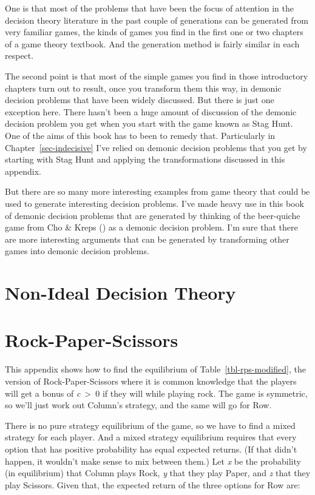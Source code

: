 \documentclass[
  12pt,
  letterpaper,
  DIV=11,
  numbers=noendperiod]{scrreprt}
\begin{document}
One is that most of the problems that have been the focus of attention
in the decision theory literature in the past couple of generations can
be generated from very familiar games, the kinds of games you find in
the first one or two chapters of a game theory textbook. And the
generation method is fairly similar in each respect.

The second point is that most of the simple games you find in those
introductory chapters turn out to result, once you transform them this
way, in demonic decision problems that have been widely discussed. But
there is just one exception here. There hasn't been a huge amount of
discussion of the demonic decision problem you get when you start with
the game known as Stag Hunt. One of the aims of this book has to been to
remedy that. Particularly in Chapter~\ref{sec-indecisive} I've relied on
demonic decision problems that you get by starting with Stag Hunt and
applying the transformations discussed in this appendix.

But there are so many more interesting examples from game theory that
could be used to generate interesting decision problems. I've made heavy
use in this book of demonic decision problems that are generated by
thinking of the beer-quiche game from Cho \& Kreps
() as a demonic decision problem. I'm
sure that there are more interesting arguments that can be generated by
transforming other games into demonic decision problems.

\chapter{Non-Ideal Decision Theory}\label{sec-nidt}

\chapter{Rock-Paper-Scissors}\label{sec-rps}

This appendix shows how to find the equilibrium of
Table~\ref{tbl-rps-modified}, the version of Rock-Paper-Scissors where
it is common knowledge that the players will get a bonus of
\emph{c}~\textgreater~0 if they will while playing rock. The game is
symmetric, so we'll just work out Column's strategy, and the same will
go for Row.

There is no pure strategy equilibrium of the game, so we have to find a
mixed strategy for each player. And a mixed strategy equilibrium
requires that every option that has positive probability has equal
expected returns. (If that didn't happen, it wouldn't make sense to mix
between them.) Let \emph{x} be the probability (in equilibrium) that
Column plays Rock, \emph{y} that they play Paper, and \emph{z} that they
play Scissors. Given that, the expected return of the three options for
Row are:
\end{document}
